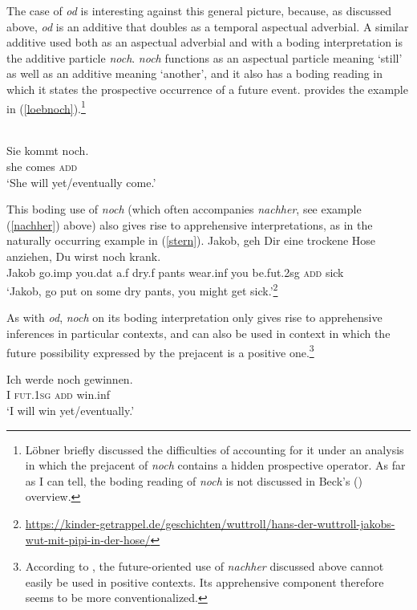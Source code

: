 \documentclass[output=paper,colorlinks,citecolor=brown]{langscibook}
\begin{document}
The case of \textit{od} is interesting against this general picture, because, as discussed above, \textit{od} is an additive that doubles as a temporal aspectual adverbial. A similar additive used both as an aspectual adverbial and with a boding interpretation is the  additive particle \textit{noch}.  \textit{noch} functions as an aspectual  particle meaning `still' as well as an additive meaning `another', and it also has a boding reading in which it states the prospective occurrence of a future event. \citet{lobner89} provides the example in (\ref{loebnoch}).\footnote{L\"{o}bner briefly discussed the difficulties of accounting for it under an analysis in which the prejacent of \textit{noch} contains a hidden prospective operator. As far as I can tell, the boding reading of \textit{noch} is not discussed in  Beck's (\citeyear{beck20}) overview.}

\ea
\label{loebnoch}  \\
\gll Sie kommt noch. \\
she comes \textsc{add} \\
\glt `She will yet/eventually come.'
\z

This boding use of \textit{noch} (which often accompanies \textit{nachher}, see example (\ref{nachher}) above) also gives rise to apprehensive interpretations, as in the naturally occurring example in (\ref{stern}). 
\ea
\label{stern}
\gll Jakob, geh Dir eine trockene Hose anziehen, Du wirst noch krank. \\
Jakob go.{\sc imp} you.{\sc dat} a.{\sc f} dry.{\sc f} pants wear.{\sc inf} you be.{\sc fut.2sg} \textsc{add} sick \\
\glt `Jakob, go put on some dry pants, you might get sick.'\footnote{\url{https://kinder-getrappel.de/geschichten/wuttroll/hans-der-wuttroll-jakobs-wut-mit-pipi-in-der-hose/}}
\z

 As with  \textit{od}, \textit{noch} on its boding interpretation only gives rise to apprehensive inferences in particular contexts, and can also be used in context in which the future possibility expressed by the prejacent is a positive one.\footnote{According to \citet{angelo-berndt16}, the future-oriented use of \textit{nachher} discussed above cannot easily be used in positive contexts. Its apprehensive component therefore seems to be more conventionalized.} 

\ea
\label{winen}
\gll Ich werde noch gewinnen. \\
I \textsc{fut.1sg} \textsc{add} win.{\sc inf} \\
\glt `I will win yet/eventually.'
\z
\end{document}
